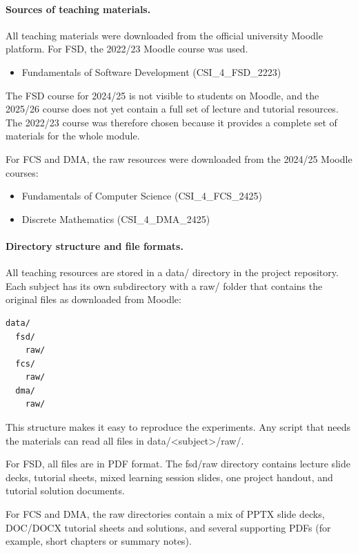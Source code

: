 \paragraph{Sources of teaching materials.}
All teaching materials were downloaded from the official university Moodle platform.
For FSD, the 2022/23 Moodle course was used.

\begin{itemize}
    \item Fundamentals of Software Development (CSI\_4\_FSD\_2223)
\end{itemize}

The FSD course for 2024/25 is not visible to students on Moodle, and the 2025/26 course does not yet contain a full set of lecture and tutorial resources. The 2022/23 course was therefore chosen because it provides a complete set of materials for the whole module.

For FCS and DMA, the raw resources were downloaded from the 2024/25 Moodle courses:

\begin{itemize}
    \item Fundamentals of Computer Science (CSI\_4\_FCS\_2425)
    \item Discrete Mathematics (CSI\_4\_DMA\_2425)
\end{itemize}

\paragraph{Directory structure and file formats.}
All teaching resources are stored in a data/ directory in the project repository. Each subject has its own subdirectory with a raw/ folder that contains the original files as downloaded from Moodle:

\begin{verbatim}
data/
  fsd/
    raw/
  fcs/
    raw/
  dma/
    raw/
\end{verbatim}

This structure makes it easy to reproduce the experiments. Any script that needs the materials can read all files in data/<subject>/raw/.

For FSD, all files are in PDF format. The fsd/raw directory contains lecture slide decks, tutorial sheets, mixed learning session slides, one project handout, and tutorial solution documents.

For FCS and DMA, the raw directories contain a mix of PPTX slide decks, DOC/DOCX tutorial sheets and solutions, and several supporting PDFs (for example, short chapters or summary notes).

